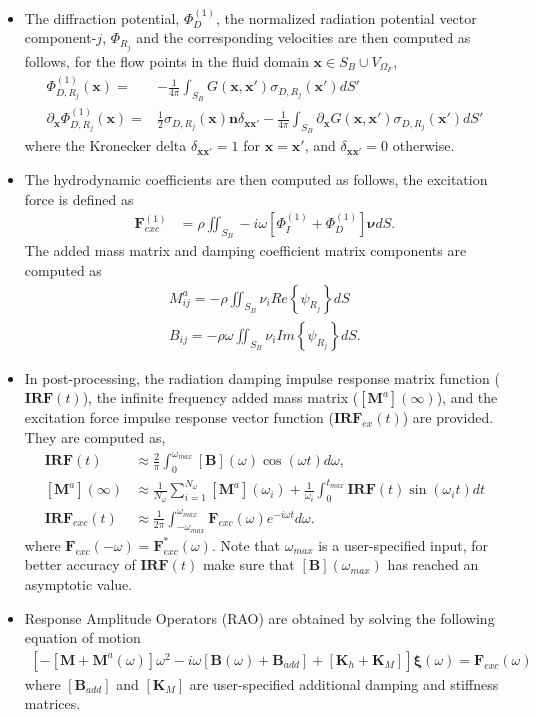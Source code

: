 \documentclass[12pt,a4paper,titlepage]{article}
\newcommand{\bs}{\boldsymbol}
\begin{document}
\begin{itemize}
\item The diffraction potential, $\Phi^{(1)}_{D}$, the normalized radiation potential vector component-$j$, $\Phi_{R_j}$ and the corresponding velocities are then computed as follows, for the flow points in the fluid domain $\bs x \in S_B \cup V_{\Omega_F}$,
\begin{align} \label{Eq:BIE_Sol_Pot_Sb}
\Phi^{(1)}_{D,R_j}(\bs x)=&-\frac{1}{4\pi}\int_{S_B} G(\bs x, \bs x') \sigma_{D,R_j}(\bs x') dS'\\
\partial_{\bs x} \Phi^{(1)}_{D,R_j}(\bs x)=&\frac{1}{2}\sigma_{D,R_j}(\bs x)\bs{n}\delta_{\bs x \bs x'}-\frac{1}{4\pi}\int_{S_B} \partial_{\bs{x}} G(\bs x, \bs x') \sigma_{D,R_j}(\bs x') dS'
\end{align}
where the Kronecker delta $\delta_{\bs x \bs x'}=1 $ for $\bs x = \bs x'$, and $\delta_{\bs x \bs x'}=0$ otherwise.
\item The hydrodynamic coefficients are then computed as follows, the excitation force is defined as
\begin{align}
\bs F_{exc}^{(1)}&=\rho \iint_{S_{B}} -i\omega\left[ \Phi_I^{(1)}+ \Phi_D^{(1)}\right]\bs \nu dS.
\end{align}
The added mass matrix and damping coefficient matrix components are computed as
\begin{align}
M^a_{ij}= -\rho \iint_{S_{B}} \nu_{i} Re \left\lbrace\psi_{R_j} \right\rbrace dS\\
B_{ij}= -\rho \omega \iint_{S_{B}} \nu_{i} Im \left\lbrace\psi_{R_j} \right\rbrace dS.
\end{align}
\item In post-processing, the radiation damping impulse response matrix function ($\bs{IRF}(t)$), the infinite frequency added mass matrix ($[\bs M^a](\infty)$), and the excitation force impulse response vector function ($\bs{IRF}_{ex}(t)$) are provided. They are computed as, 
\begin{align}
\bs{IRF}(t)&\approx\frac{2}{\pi}\int_0^{\omega_{max}}[\bs B](\omega)\cos(\omega t)d\omega, \\
[\bs M^a](\infty)&\approx  \frac{1}{N_{\omega}}\sum_{i=1}^{N_{\omega}}[\bs M^a](\omega_i)+\frac{1}{\omega_i}\int_0^{t_{max}}\bs{IRF}(t)\sin(\omega_i t)dt\\
\bs{IRF}_{exc}(t)&\approx\frac{1}{2\pi}\int_{-\omega_{max}}^{\omega_{max}}\bs F_{exc}(\omega)e^{-i\omega t}d\omega.
\end{align}
where $\bs F_{exc}(-\omega)=\bs F^*_{exc}(\omega)$. Note that $\omega_{max}$ is a user-specified input, for better accuracy of $\bs{IRF}(t)$ make sure that $[\bs B ](\omega_{max})$ has reached an asymptotic value.
\item Response Amplitude Operators (RAO) are obtained by solving the following equation of motion
\begin{align}\label{Eq:RAO}
\left[-[\bs M+\bs M^a(\omega)]\omega^2-i\omega[\bs B(\omega)+\bs B_{add}]+[\bs K_h+\bs K_M]\right]\mathcal{\bs \xi}(\omega)=\bs F_{exc}(\omega)
\end{align}
where $[\bs B_{add}]$ and $[\bs K_M]$ are user-specified additional damping and stiffness matrices.
\end{itemize}
\end{document}
